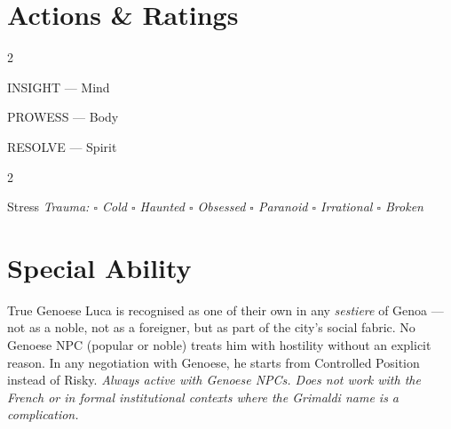 \section*{Actions \& Ratings}
\begin{multicols}{2}
\begin{attributoblock}[GrimaldiPurple]{INSIGHT --- Mind}
\end{attributoblock}
\begin{attributoblock}[GrimaldiPurple]{PROWESS --- Body}
\end{attributoblock}
\end{multicols}
\begin{attributoblock}[GrimaldiPurple]{RESOLVE --- Spirit}
  \begin{multicols}{2}
  \end{multicols}
\end{attributoblock}

\medskip
\begin{pgclockbox}{Stress \hfill {}}
\small\textit{Trauma: $\square$ Cold \quad $\square$ Haunted \quad $\square$ Obsessed \quad $\square$ Paranoid \quad $\square$ Irrational \quad $\square$ Broken}
\end{pgclockbox}

\section*{Special Ability}
\begin{grimaldibox}{True Genoese}
Luca is recognised as one of their own in any \textit{sestiere} of Genoa --- not as
a noble, not as a foreigner, but as part of the city's social fabric. No Genoese NPC
(popular or noble) treats him with hostility without an explicit reason. In any
negotiation with Genoese, he starts from Controlled Position instead of Risky.
\textit{Always active with Genoese NPCs. Does not work with the French or in formal institutional contexts where the Grimaldi name is a complication.}
\end{grimaldibox}

